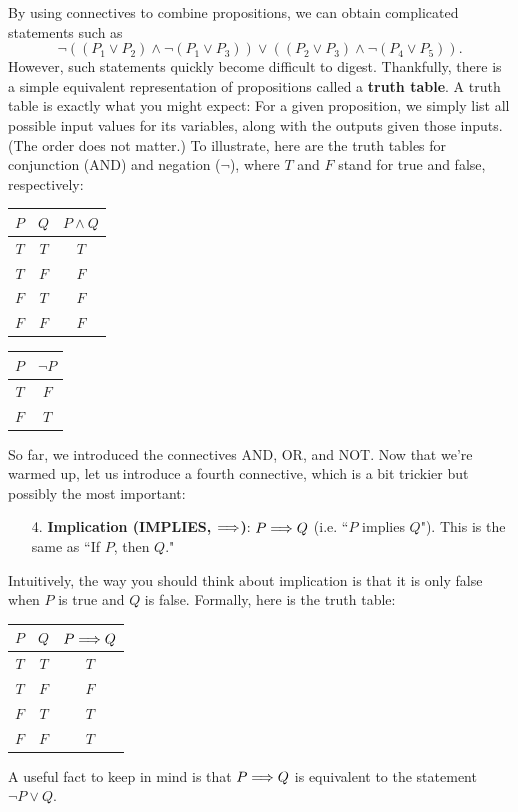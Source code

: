 \documentclass[11pt]{article}
\begin{document}
By using connectives to combine propositions, we can obtain complicated statements such as
$$
    \neg((P_1 \vee P_2) \wedge \neg (P_1\vee P_3)) \vee ((P_2 \vee P_3) \wedge \neg (P_4\vee P_5)).
$$
However, such statements quickly become difficult to digest. Thankfully, there is a simple equivalent representation of propositions called a \textbf{truth table}. A truth table is exactly what you might expect: For a given proposition, we simply list all possible input values for its variables, along with the outputs given those inputs. (The order does not matter.) To illustrate, here are the truth tables for conjunction (AND) and negation ($\neg$), where $T$ and $F$ stand for true and false, respectively:
\begin{center}
\begin{tabular}{|c|c||c|}
\hline
$P$     & $Q$     & $P \wedge Q$ \\
\hline
$T$  & $T$  & $T$ \\
$T$  & $F$ & $F$ \\
$F$ & $T$  & $F$ \\
$F$ & $F$ & $F$ \\
\hline
\end{tabular}
\hspace{20mm}
\begin{tabular}{|c||c|}
\hline
$P$     & $\neg P$ \\
\hline
$T$  & $F$ \\
$F$  & $T$ \\
\hline
\end{tabular}
\end{center}


So far, we introduced the connectives AND, OR, and NOT. Now that we're warmed up, let us introduce a fourth connective, which is a bit trickier but possibly the most important:
\begin{enumerate}
    \item[4.] \textbf{Implication (IMPLIES, $\Longrightarrow$)}: $P \Longrightarrow Q$ (i.e. ``$P$ implies $Q$").  This is the same as ``If $P$, then $Q$."
\end{enumerate}
Intuitively, the way you should think about implication is that it is only false when $P$ is true and $Q$ is false. Formally, here is the truth table:
\begin{center}
\begin{tabular}{|c|c||c|}
\hline
$P$     & $Q$     & $P \Longrightarrow Q$ \\%
\hline
$T$  & $T$  & $T$ \\%
$T$  & $F$ & $F$ \\%
$F$ & $T$  & $T$ \\%
$F$ & $F$ & $T$ \\%
\hline
\end{tabular}
\end{center}
A useful fact to keep in mind is that $P\Longrightarrow Q$ is equivalent to the statement $\neg P\vee Q$.
\end{document}
